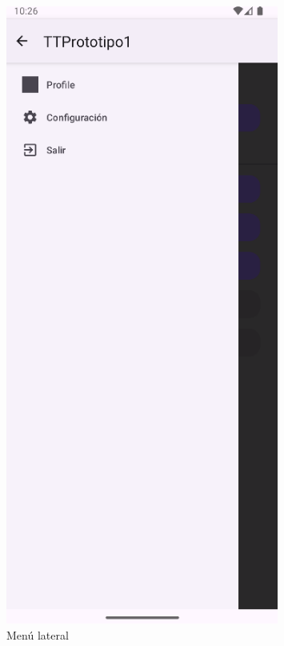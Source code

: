 \documentclass[a4paper,openright,12pt]{article}
\begin{document}
\begin{figure}[htp]
\begin{minipage}{0.3\textwidth}
        \includegraphics[width=0.8\textwidth]{Images/Vista_It2_2.png} 
        \caption{Menú lateral}
        \label{fig:figura2}
    \end{minipage}
    \hfill
    \begin{minipage}{0.3\textwidth}
        \centering

\end{minipage}
\end{figure}
\end{document}
